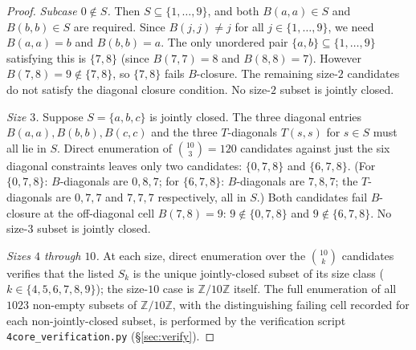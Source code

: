 \documentclass[11pt,reqno]{amsart}
\theoremstyle{plain}
\theoremstyle{definition}
\theoremstyle{remark}
\newcommand{\Z}{\mathbb{Z}}
\newcommand{\Zten}{\Z/10\Z}
\begin{document}
\begin{proof}
\emph{Subcase $0\notin S$.} Then $S\subseteq\{1,\dots,9\}$, and
both $B(a,a)\in S$ and $B(b,b)\in S$ are required. Since
$B(j,j)\neq j$ for all $j\in\{1,\dots,9\}$, we need $B(a,a)=b$
and $B(b,b)=a$. The only unordered pair
$\{a,b\}\subseteq\{1,\dots,9\}$ satisfying this is $\{7,8\}$
(since $B(7,7)=8$ and $B(8,8)=7$). However $B(7,8)=9\notin\{7,8\}$,
so $\{7,8\}$ fails $B$-closure. The remaining size-$2$ candidates
do not satisfy the diagonal closure condition. No size-$2$ subset
is jointly closed.

\emph{Size $3$.} Suppose $S=\{a,b,c\}$ is jointly closed. The
three diagonal entries $B(a,a),B(b,b),B(c,c)$ and the three
$T$-diagonals $T(s,s)$ for $s\in S$ must all lie in $S$. Direct
enumeration of $\binom{10}{3}=120$ candidates against just the
six diagonal constraints leaves only two candidates: $\{0,7,8\}$
and $\{6,7,8\}$. (For $\{0,7,8\}$: $B$-diagonals are $0,8,7$; for
$\{6,7,8\}$: $B$-diagonals are $7,8,7$; the $T$-diagonals are
$0,7,7$ and $7,7,7$ respectively, all in $S$.) Both candidates
fail $B$-closure at the off-diagonal cell $B(7,8)=9$:
$9\notin\{0,7,8\}$ and $9\notin\{6,7,8\}$. No size-$3$ subset is
jointly closed.

\emph{Sizes $4$ through $10$.} At each size, direct enumeration
over the $\binom{10}{k}$ candidates verifies that the listed
$S_{k}$ is the unique jointly-closed subset of its size class
($k\in\{4,5,6,7,8,9\}$); the size-$10$ case is $\Zten$ itself.
The full enumeration of all $1023$ non-empty subsets of $\Zten$,
with the distinguishing failing cell recorded for each
non-jointly-closed subset, is performed by the verification
script \texttt{4core\_verification.py} (\S\ref{sec:verify}).
\end{proof}
\end{document}
